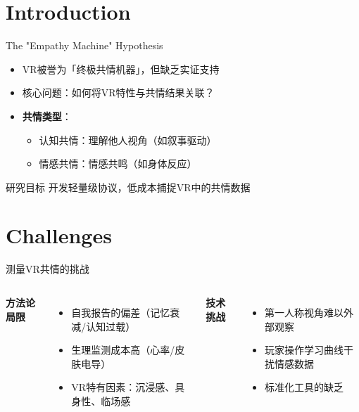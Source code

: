 \documentclass[aspectratio=169,xcolor=dvipsnames]{beamer}
\begin{document}
\section{Introduction}

\begin{frame}{The "Empathy Machine" Hypothesis}
    \begin{itemize}
        \item VR被誉为「终极共情机器」，但缺乏实证支持
        \item \alert{核心问题}：如何将VR特性与共情结果关联？
        \item \textbf{共情类型}：
            \begin{itemize}
                \item 认知共情：理解他人视角（如叙事驱动）
                \item 情感共情：情感共鸣（如身体反应）
            \end{itemize}
    \end{itemize}
    \begin{block}{研究目标}
        开发轻量级协议，低成本捕捉VR中的共情数据
    \end{block}
\end{frame}

\section{Challenges}

\begin{frame}{测量VR共情的挑战}
    \begin{columns}[t]
        \textbf{方法论局限}
        \begin{itemize}
            \item 自我报告的偏差（记忆衰减/认知过载）
            \item 生理监测成本高（心率/皮肤电导）
            \item VR特有因素：沉浸感、具身性、临场感
        \end{itemize}
        
        \textbf{技术挑战}
        \begin{itemize}
            \item 第一人称视角难以外部观察
            \item 玩家操作学习曲线干扰情感数据
            \item 标准化工具的缺乏
        \end{itemize}
    \end{columns}
\end{frame}
\end{document}
